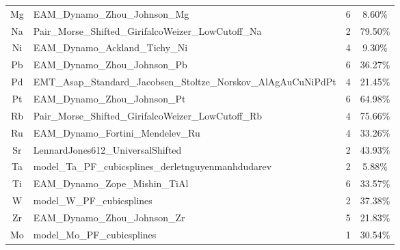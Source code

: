 \documentclass[%
 reprint,
 amsmath,amssymb,
 aps,
]{revtex4-1}
\begin{document}
\begin{longtable*}{@{\extracolsep{\fill}}  c  p{5in} c  c}
 Mg & EAM\_Dynamo\_Zhou\_Johnson\_Mg & 6 & 8.60\% \\
 Na & Pair\_Morse\_Shifted\_GirifalcoWeizer\_LowCutoff\_Na & 2 & 79.50\% \\
 Ni & EAM\_Dynamo\_Ackland\_Tichy\_Ni & 4 & 9.30\% \\
 Pb & EAM\_Dynamo\_Zhou\_Johnson\_Pb & 6 & 36.27\% \\
 Pd & EMT\_Asap\_Standard\_Jacobsen\_Stoltze\_Norskov\_AlAgAuCuNiPdPt & 4 & 21.45\% \\
 Pt & EAM\_Dynamo\_Zhou\_Johnson\_Pt & 6 & 64.98\% \\
 Rb & Pair\_Morse\_Shifted\_GirifalcoWeizer\_LowCutoff\_Rb & 4 & 75.66\% \\
 Ru & EAM\_Dynamo\_Fortini\_Mendelev\_Ru & 4 & 33.26\% \\
 Sr & LennardJones612\_UniversalShifted & 2 & 43.93\% \\
 Ta & model\_Ta\_PF\_cubicsplines\_derletnguyenmanhdudarev & 2 & 5.88\% \\
 Ti & EAM\_Dynamo\_Zope\_Mishin\_TiAl & 6 & 33.57\% \\
 W & model\_W\_PF\_cubicsplines & 2 & 37.38\% \\
 Zr & EAM\_Dynamo\_Zhou\_Johnson\_Zr & 5 & 21.83\% \\
 Mo & model\_Mo\_PF\_cubicsplines & 1 & 30.54\% \\
\end{longtable*}
\end{document}
